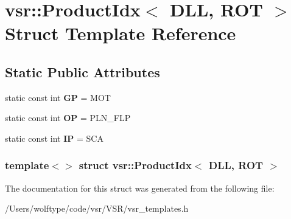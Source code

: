 \hypertarget{structvsr_1_1_product_idx_3_01_d_l_l_00_01_r_o_t_01_4}{\section{vsr\-:\-:Product\-Idx$<$ D\-L\-L, R\-O\-T $>$ Struct Template Reference}
\label{structvsr_1_1_product_idx_3_01_d_l_l_00_01_r_o_t_01_4}
}
\subsection*{Static Public Attributes}
\begin{DoxyCompactItemize}
\item 
\hypertarget{structvsr_1_1_product_idx_3_01_d_l_l_00_01_r_o_t_01_4_a8418fc4ffa436861b3bed9631cdc7cc8}{static const int {\bfseries G\-P} = M\-O\-T}\label{structvsr_1_1_product_idx_3_01_d_l_l_00_01_r_o_t_01_4_a8418fc4ffa436861b3bed9631cdc7cc8}

\item 
\hypertarget{structvsr_1_1_product_idx_3_01_d_l_l_00_01_r_o_t_01_4_aebedfcc1f9071162532be98b34af2667}{static const int {\bfseries O\-P} = P\-L\-N\-\_\-\-F\-L\-P}\label{structvsr_1_1_product_idx_3_01_d_l_l_00_01_r_o_t_01_4_aebedfcc1f9071162532be98b34af2667}

\item 
\hypertarget{structvsr_1_1_product_idx_3_01_d_l_l_00_01_r_o_t_01_4_ab30713925a6cc042ace2815f5cc4d1c0}{static const int {\bfseries I\-P} = S\-C\-A}\label{structvsr_1_1_product_idx_3_01_d_l_l_00_01_r_o_t_01_4_ab30713925a6cc042ace2815f5cc4d1c0}

\end{DoxyCompactItemize}
\subsubsection*{template$<$$>$ struct vsr\-::\-Product\-Idx$<$ D\-L\-L, R\-O\-T $>$}



The documentation for this struct was generated from the following file\-:\begin{DoxyCompactItemize}
\item 
/\-Users/wolftype/code/vsr/\-V\-S\-R/vsr\-\_\-templates.\-h\end{DoxyCompactItemize}
